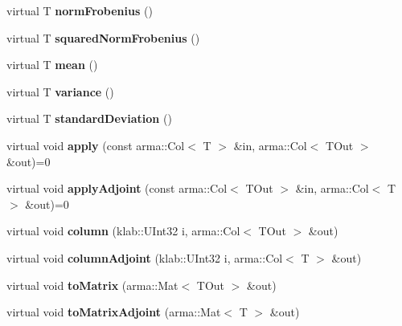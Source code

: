 \begin{DoxyCompactItemize}
\item 
virtual T {\bfseries norm\+Frobenius} ()\hypertarget{classkl1p_1_1TOperator_ac34a9963d2412180e5ceea10dd6b90cf}{}\label{classkl1p_1_1TOperator_ac34a9963d2412180e5ceea10dd6b90cf}

\item 
virtual T {\bfseries squared\+Norm\+Frobenius} ()\hypertarget{classkl1p_1_1TOperator_a29e15b09b949a4db47226656601e4d3e}{}\label{classkl1p_1_1TOperator_a29e15b09b949a4db47226656601e4d3e}

\item 
virtual T {\bfseries mean} ()\hypertarget{classkl1p_1_1TOperator_a527585e541109e82f6b08727d1e4f933}{}\label{classkl1p_1_1TOperator_a527585e541109e82f6b08727d1e4f933}

\item 
virtual T {\bfseries variance} ()\hypertarget{classkl1p_1_1TOperator_a09390c93ff186c53cebd43836d1710ff}{}\label{classkl1p_1_1TOperator_a09390c93ff186c53cebd43836d1710ff}

\item 
virtual T {\bfseries standard\+Deviation} ()\hypertarget{classkl1p_1_1TOperator_a20759edecee084f43e0dab6fff83395d}{}\label{classkl1p_1_1TOperator_a20759edecee084f43e0dab6fff83395d}

\item 
virtual void {\bfseries apply} (const arma\+::\+Col$<$ T $>$ \&in, arma\+::\+Col$<$ T\+Out $>$ \&out)=0\hypertarget{classkl1p_1_1TOperator_a0eb9155ae2fcefa3d7554256515f6b54}{}\label{classkl1p_1_1TOperator_a0eb9155ae2fcefa3d7554256515f6b54}

\item 
virtual void {\bfseries apply\+Adjoint} (const arma\+::\+Col$<$ T\+Out $>$ \&in, arma\+::\+Col$<$ T $>$ \&out)=0\hypertarget{classkl1p_1_1TOperator_adf4e42675aa25e88cd780a78707cf666}{}\label{classkl1p_1_1TOperator_adf4e42675aa25e88cd780a78707cf666}

\item 
virtual void {\bfseries column} (klab\+::\+U\+Int32 i, arma\+::\+Col$<$ T\+Out $>$ \&out)\hypertarget{classkl1p_1_1TOperator_aeb09810e2a44d8df52a25974157eb4f0}{}\label{classkl1p_1_1TOperator_aeb09810e2a44d8df52a25974157eb4f0}

\item 
virtual void {\bfseries column\+Adjoint} (klab\+::\+U\+Int32 i, arma\+::\+Col$<$ T $>$ \&out)\hypertarget{classkl1p_1_1TOperator_a20456d351538e1a5a4b1c8e640a26754}{}\label{classkl1p_1_1TOperator_a20456d351538e1a5a4b1c8e640a26754}

\item 
virtual void {\bfseries to\+Matrix} (arma\+::\+Mat$<$ T\+Out $>$ \&out)\hypertarget{classkl1p_1_1TOperator_a22da1003e7bc3e654251a5a7ff25accb}{}\label{classkl1p_1_1TOperator_a22da1003e7bc3e654251a5a7ff25accb}

\item 
virtual void {\bfseries to\+Matrix\+Adjoint} (arma\+::\+Mat$<$ T $>$ \&out)\hypertarget{classkl1p_1_1TOperator_afcc44bad9abb64b3216f4be2d5b8b284}{}\label{classkl1p_1_1TOperator_afcc44bad9abb64b3216f4be2d5b8b284}

\end{DoxyCompactItemize}
